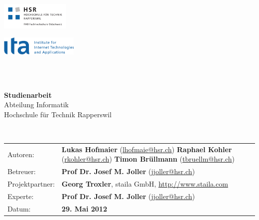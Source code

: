 \begin{titlepage}
\begin{flushleft}

\noindent\begin{minipage}[t]{0.49\textwidth}
	\begin{flushleft}
		\vspace{0pt} %
		\includegraphics[width=125px]{images_Logo/hsrlogo.pdf}
	\end{flushleft}
\end{minipage}
\hfill
\begin{minipage}[t]{0.49\textwidth}
	\begin{flushright}
		\vspace{0pt} %
		\includegraphics[width=140px]{images_Logo/italogo.pdf}
	\end{flushright}
\end{minipage}
\\[1.5cm]

\\[1.5cm]

\begin{center}
{\Large \bfseries Studienarbeit}\\[0.5cm]
{\Large
	Abteilung Informatik \\[0.2cm]
	Hochschule für Technik Rapperswil
}\\[1.5cm]
\end{center}

\\[1.5cm]

\begin{tabular}{lp{12cm}}
Autoren: & \textbf{Lukas Hofmaier} (\url{lhofmaie@hsr.ch}) \newline
 \textbf{Raphael Kohler} (\url{rkohler@hsr.ch}) \newline 
 \textbf{Timon Brüllmann} (\url{tbruellm@hsr.ch}) \\ 
Betreuer: & \textbf{Prof Dr. Josef M. Joller} (\url{jjoller@hsr.ch}) \\ 
Projektpartner: & \textbf{Georg Troxler}, staila GmbH, \url{http://www.staila.com} \\ 
Experte: & \textbf{Prof Dr. Josef M. Joller} (\url{jjoller@hsr.ch}) \\ 
Datum: & \textbf{29. Mai 2012} \\ 
\end{tabular}


\end{flushleft}
\end{titlepage}
